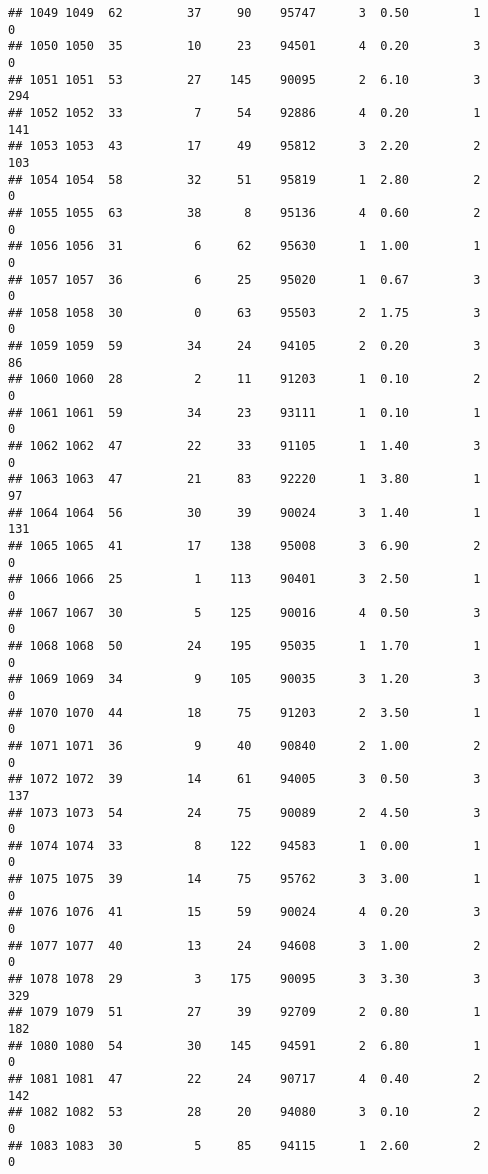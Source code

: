 \documentclass[
]{article}
\begin{document}
\begin{verbatim}
## 1049 1049  62         37     90    95747      3  0.50         1        0
## 1050 1050  35         10     23    94501      4  0.20         3        0
## 1051 1051  53         27    145    90095      2  6.10         3      294
## 1052 1052  33          7     54    92886      4  0.20         1      141
## 1053 1053  43         17     49    95812      3  2.20         2      103
## 1054 1054  58         32     51    95819      1  2.80         2        0
## 1055 1055  63         38      8    95136      4  0.60         2        0
## 1056 1056  31          6     62    95630      1  1.00         1        0
## 1057 1057  36          6     25    95020      1  0.67         3        0
## 1058 1058  30          0     63    95503      2  1.75         3        0
## 1059 1059  59         34     24    94105      2  0.20         3       86
## 1060 1060  28          2     11    91203      1  0.10         2        0
## 1061 1061  59         34     23    93111      1  0.10         1        0
## 1062 1062  47         22     33    91105      1  1.40         3        0
## 1063 1063  47         21     83    92220      1  3.80         1       97
## 1064 1064  56         30     39    90024      3  1.40         1      131
## 1065 1065  41         17    138    95008      3  6.90         2        0
## 1066 1066  25          1    113    90401      3  2.50         1        0
## 1067 1067  30          5    125    90016      4  0.50         3        0
## 1068 1068  50         24    195    95035      1  1.70         1        0
## 1069 1069  34          9    105    90035      3  1.20         3        0
## 1070 1070  44         18     75    91203      2  3.50         1        0
## 1071 1071  36          9     40    90840      2  1.00         2        0
## 1072 1072  39         14     61    94005      3  0.50         3      137
## 1073 1073  54         24     75    90089      2  4.50         3        0
## 1074 1074  33          8    122    94583      1  0.00         1        0
## 1075 1075  39         14     75    95762      3  3.00         1        0
## 1076 1076  41         15     59    90024      4  0.20         3        0
## 1077 1077  40         13     24    94608      3  1.00         2        0
## 1078 1078  29          3    175    90095      3  3.30         3      329
## 1079 1079  51         27     39    92709      2  0.80         1      182
## 1080 1080  54         30    145    94591      2  6.80         1        0
## 1081 1081  47         22     24    90717      4  0.40         2      142
## 1082 1082  53         28     20    94080      3  0.10         2        0
## 1083 1083  30          5     85    94115      1  2.60         2        0

\end{verbatim}
\end{document}
